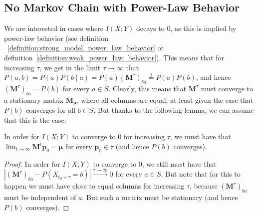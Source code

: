 \documentclass[../../main.tex]{subfiles}
\begin{document}
\subsection{No Markov Chain with Power-Law Behavior}
    We are interested in cases where $I(X; Y)$ decays to $0$, as this is implied by power-law behavior (see definition ~\ref{definition:strong_model_power_law_behavior} or definition~\ref{definition:weak_power_law_behavior}). This means that for increasing $\tau$, we get in the limit $\tau \to \infty$ that $P(a, b) = P(a) P(b \mid a) = P(a) (\bm{M}^\tau)_{ba} \overset{!}{=} P(a) P(b)$, and hence $(\bm{M}^\tau)_{ba} = P(b)$ for every $a \in S$. Clearly, this means that $\bm{M}^\tau$ must converge to a stationary matrix $\bm{M_\mu}$, where all columns are equal, at least given the case that $P(b)$ converges for all $b \in S$. But thanks to the following lemma, we can assume that this is the case:

    \begin{lemma}
        In order for $I(X; Y)$ to converge to $0$ for increasing $\tau$, we must have that $\lim_{t \to \infty}\bm{M}^t \bm{p}_0 = \bm{\mu}$ for every $\bm{p}_0 \in \tau$ (and hence $P(b)$ converges).
    \end{lemma}
    \vspace{-2.5em}
    \begin{proof}
        In order for $I(X; Y)$ to converge to $0$, we still must have that $|(\bm{M}^\tau)_{ba} - P(X_{t_0 + \tau} = b)| \xrightarrow{\tau \to \infty} 0$ for every $a \in S$. But note that for this to happen we must have close to equal columns for increasing $\tau$, because $(\bm{M}^\tau)_{ba}$ must be independent of $a$. But such a matrix must be stationary (and hence $P(b)$ converges).
    \end{proof}
\end{document}
